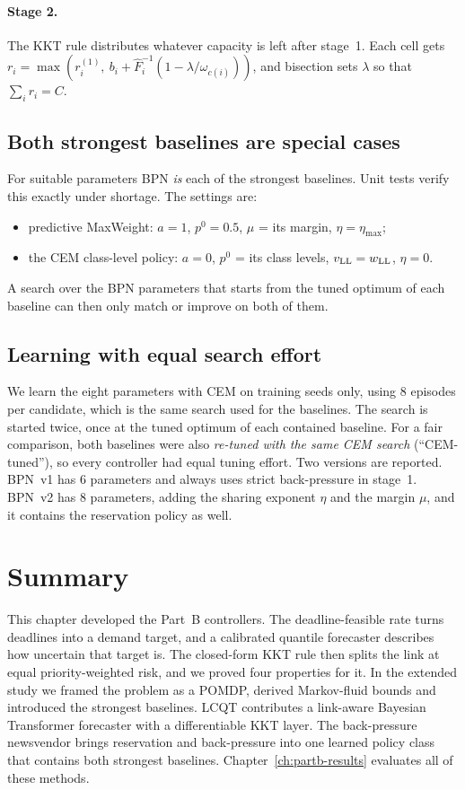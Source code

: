 \paragraph{Stage 2.} The KKT rule distributes whatever capacity is left after stage~1. Each cell gets $r_i = \max(r_i^{(1)},\ b_i + \hat F_i^{-1}(1 - \lambda/\omega_{c(i)}))$, and bisection sets $\lambda$ so that $\sum_i r_i = C$.

\subsection{Both strongest baselines are special cases}

For suitable parameters BPN \emph{is} each of the strongest baselines. Unit tests verify this exactly under shortage. The settings are:
\begin{itemize}
  \item predictive MaxWeight: $a = 1$, $p^0 = 0.5$, $\mu$ = its margin, $\eta = \eta_{\max}$;
  \item the CEM class-level policy: $a = 0$, $p^0$ = its class levels, $v_{\rm LL} = w_{\rm LL}$, $\eta = 0$.
\end{itemize}
A search over the BPN parameters that starts from the tuned optimum of each baseline can then only match or improve on both of them.

\subsection{Learning with equal search effort}

We learn the eight parameters with CEM on training seeds only, using 8 episodes per candidate, which is the same search used for the baselines. The search is started twice, once at the tuned optimum of each contained baseline. For a fair comparison, both baselines were also \emph{re-tuned with the same CEM search} (``CEM-tuned''), so every controller had equal tuning effort. Two versions are reported. BPN~v1 has 6 parameters and always uses strict back-pressure in stage~1. BPN~v2 has 8 parameters, adding the sharing exponent $\eta$ and the margin $\mu$, and it contains the reservation policy as well.

\section{Summary}

This chapter developed the Part~B controllers. The deadline-feasible rate turns deadlines into a demand target, and a calibrated quantile forecaster describes how uncertain that target is. The closed-form KKT rule then splits the link at equal priority-weighted risk, and we proved four properties for it. In the extended study we framed the problem as a POMDP, derived Markov-fluid bounds and introduced the strongest baselines. LCQT contributes a link-aware Bayesian Transformer forecaster with a differentiable KKT layer. The back-pressure newsvendor brings reservation and back-pressure into one learned policy class that contains both strongest baselines. Chapter~\ref{ch:partb-results} evaluates all of these methods.

